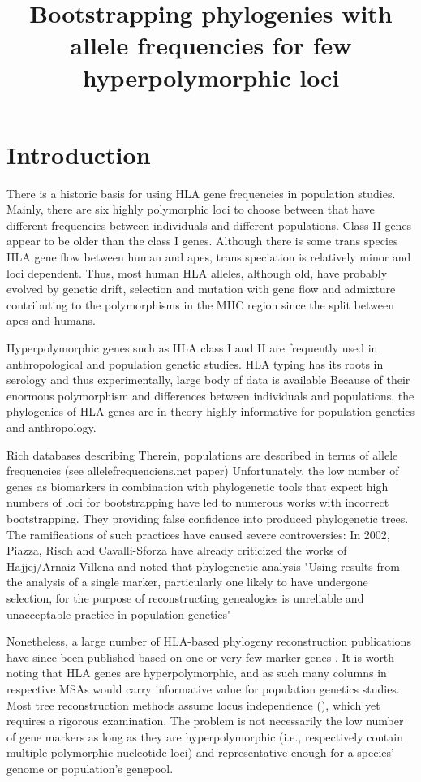 
\title{Bootstrapping phylogenies with allele frequencies for few hyperpolymorphic loci}

\section{Introduction}
There is a historic basis for using HLA gene frequencies in population studies. Mainly, there are six highly polymorphic
loci to choose between that have different frequencies between individuals and different populations. Class II genes
appear to be older than the class I genes. Although there is some trans species HLA gene flow between human and apes,
trans speciation is relatively minor and loci dependent. Thus, most human HLA alleles, although old, have probably
evolved by genetic drift, selection and mutation with gene flow and admixture contributing to the polymorphisms in the
MHC region since the split between apes and humans.

Hyperpolymorphic genes such as HLA class I and II are frequently used in anthropological and population genetic studies.
HLA typing has its roots in serology and thus experimentally, large body of data is available
Because of their enormous polymorphism and differences between individuals and populations, the phylogenies of HLA genes
are in theory highly informative for population genetics and anthropology.

Rich databases describing
Therein, populations are described in terms of allele frequencies (see allelefrequenciens.net paper)
Unfortunately, the low number of genes as biomarkers in combination with phylogenetic tools that expect high numbers of
loci for bootstrapping have led to numerous works with incorrect bootstrapping.
They providing false confidence into produced phylogenetic trees. The ramifications of such practices have caused
severe controversies:
In 2002, Piazza, Risch and Cavalli-Sforza have already criticized the works of Hajjej/Arnaiz-Villena and noted that
phylogenetic analysis  "Using results from the analysis of a single marker, particularly one likely to
have undergone selection, for the purpose of reconstructing genealogies is unreliable and unacceptable
practice in population genetics"

Nonetheless, a large number of HLA-based phylogeny reconstruction publications have since been  published based on one
or very few marker genes \cite{}.
It is worth noting that HLA genes are hyperpolymorphic, and as such many columns in respective MSAs would carry
informative value for population genetics studies. Most tree reconstruction methods assume locus independence
(\cite{Efron1996Nov}), which yet requires a rigorous examination. The problem is not necessarily the low number of
gene markers as long as they are hyperpolymorphic (i.e., respectively contain multiple polymorphic nucleotide loci)
and representative enough for a species' genome or population's genepool.

